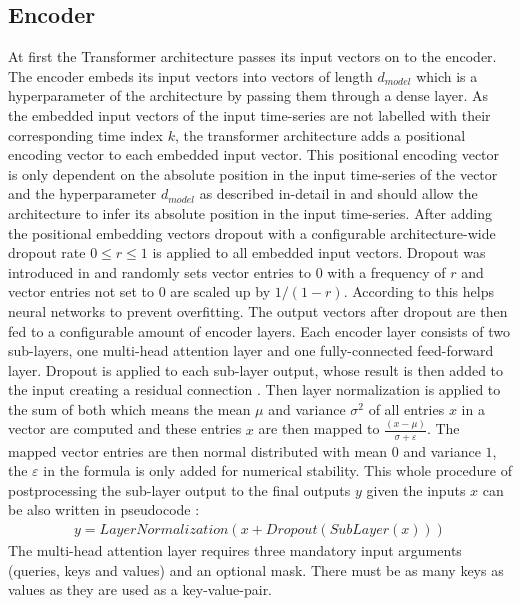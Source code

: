 \documentclass[draft,final]{vutinfth} %
\begin{document}
    \subsection{Encoder}
    At first the Transformer architecture passes its input vectors on to the encoder.
    The encoder embeds its input vectors into vectors of length $d_{model}$ which is a hyperparameter of the architecture by passing them through a dense layer.
    As the embedded input vectors of the input time-series are not labelled with their corresponding time index $k$, the transformer architecture adds a positional encoding vector to each embedded input vector.
    This positional encoding vector is only dependent on the absolute position in the input time-series of the vector and the hyperparameter $d_{model}$ as described in-detail in \cite[p. 6]{Transformer} and should allow the architecture to infer its absolute position in the input time-series.
    After adding the positional embedding vectors dropout with a configurable architecture-wide dropout rate $0 \leq r \leq 1$ is applied to all embedded input vectors.
    Dropout was introduced in \cite{dropout} and randomly sets vector entries to $0$ with a frequency of $r$ and vector entries not set to $0$ are scaled up by $1/(1-r)$.
    According to \cite[p. 1]{dropout} this helps neural networks to prevent overfitting.
    The output vectors after dropout are then fed to a configurable amount of encoder layers.
    Each encoder layer consists of two sub-layers, one multi-head attention layer and one fully-connected feed-forward layer.
    Dropout is applied to each sub-layer output, whose result is then added to the input creating a residual connection \cite{ResNet}.
    Then layer normalization \cite{layer_norm} is applied to the sum of both which means the mean $\mu$ and variance $\sigma^2$ of all entries $x$ in a vector are computed and these entries $x$ are then mapped to $\frac{(x-\mu)}{\sigma + \varepsilon}$.
    The mapped vector entries are then normal distributed with mean $0$ and variance $1$, the $\varepsilon$ in the formula is only added for numerical stability.
    This whole procedure of postprocessing the sub-layer output to the final outputs $y$ given the inputs $x$ can be also written in pseudocode \cite[p. 3]{Transformer}:
    \begin{align}
    y = LayerNormalization(x + Dropout(SubLayer(x)))
    \end{align}
    The multi-head attention layer requires three mandatory input arguments (queries, keys and values) and an optional mask.
    There must be as many keys as values as they are used as a key-value-pair.
\end{document}

